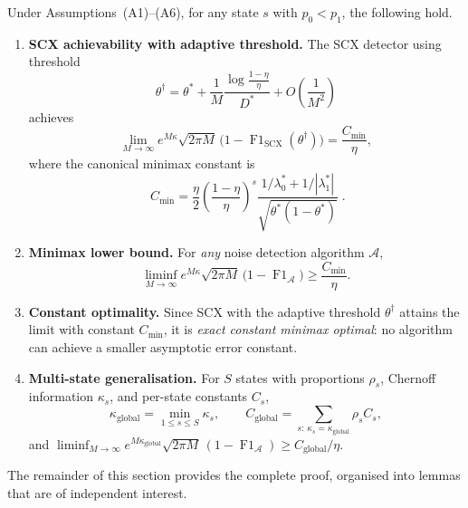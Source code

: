 \begin{theorem}
  \label{thm:exact_constant}
  Under Assumptions~(A1)--(A6), for any state $s$ with $p_0<p_1$, the
  following hold.
  \begin{enumerate}[label=(\alph*)]
    \item \textbf{SCX achievability with adaptive threshold.}
      The SCX detector using threshold
      \[
      \theta^\dagger = \theta^*
        + \frac{1}{M}\frac{\log\frac{1-\eta}{\eta}}{D^*}
        + O\!\left(\frac1{M^2}\right)
      \]
      achieves
      \[
      \lim_{M\to\infty}
        e^{M\kappa}\sqrt{2\pi M}\,
        \bigl(1-\operatorname{F1}_{\text{SCX}}(\theta^\dagger)\bigr)
      = \frac{C_{\min}}{\eta},
      \]
      where the canonical minimax constant is
      \[
      \boxed{\;
      C_{\min}
      = \frac{\eta}{2}
        \left(\frac{1-\eta}{\eta}\right)^{\!s}
        \frac{1/\lambda_0^* + 1/|\lambda_1^*|}
             {\sqrt{\theta^*(1-\theta^*)}}\;}.
      \]

    \item \textbf{Minimax lower bound.}
      For \emph{any} noise detection algorithm $\mathcal{A}$,
      \[
      \liminf_{M\to\infty}
        e^{M\kappa}\sqrt{2\pi M}\,
        \bigl(1-\operatorname{F1}_{\mathcal{A}}\bigr)
      \ge \frac{C_{\min}}{\eta}.
      \]

    \item \textbf{Constant optimality.}
      Since SCX with the adaptive threshold $\theta^\dagger$ attains the
      limit with constant $C_{\min}$, it is \emph{exact constant minimax
      optimal}: no algorithm can achieve a smaller asymptotic error constant.

    \item \textbf{Multi-state generalisation.}
      For $S$ states with proportions $\rho_s$, Chernoff information
      $\kappa_s$, and per-state constants $C_s$,
      \[
      \kappa_{\text{global}} = \min_{1\le s\le S}\kappa_s,\qquad
      C_{\text{global}} = \sum_{s:\,\kappa_s=\kappa_{\text{global}}} \rho_s C_s,
      \]
      and $\displaystyle\liminf_{M\to\infty}
        e^{M\kappa_{\text{global}}}\sqrt{2\pi M}\,
        (1-\operatorname{F1}_{\mathcal{A}})
        \ge C_{\text{global}}/\eta$.
  \end{enumerate}
\end{theorem}

The remainder of this section provides the complete proof, organised into
lemmas that are of independent interest.

